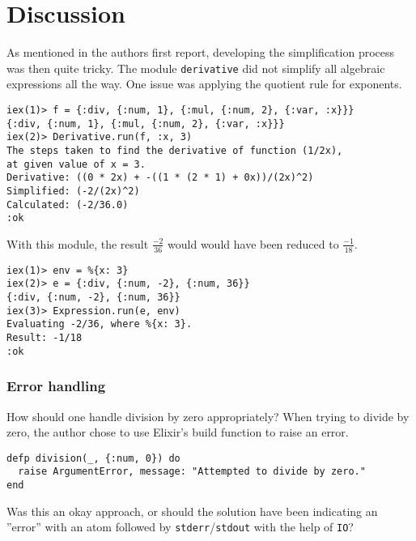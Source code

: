 \documentclass[a4paper,11pt]{article}
\begin{document}
\section*{Discussion}
\label{sec:discussion}
As mentioned in the authors first report,
developing the simplification process was then quite tricky.
The module \texttt{derivative} did not simplify
all algebraic expressions all the way.
One issue was applying the quotient rule for exponents.
\begin{verbatim}
iex(1)> f = {:div, {:num, 1}, {:mul, {:num, 2}, {:var, :x}}}
{:div, {:num, 1}, {:mul, {:num, 2}, {:var, :x}}}
iex(2)> Derivative.run(f, :x, 3)
The steps taken to find the derivative of function (1/2x),
at given value of x = 3.
Derivative: ((0 * 2x) + -((1 * (2 * 1) + 0x))/(2x)^2)
Simplified: (-2/(2x)^2)
Calculated: (-2/36.0)
:ok
\end{verbatim}
With this module, the result $\frac{-2}{36}$ would would have been reduced to $\frac{-1}{18}$.
\begin{verbatim}
iex(1)> env = %{x: 3}
iex(2)> e = {:div, {:num, -2}, {:num, 36}}
{:div, {:num, -2}, {:num, 36}}
iex(3)> Expression.run(e, env)
Evaluating -2/36, where %{x: 3}.
Result: -1/18
:ok
\end{verbatim}
\subsubsection*{Error handling}
How should one handle division by zero appropriately?
When trying to divide by zero, the author chose to use Elixir's build function
to raise an error.
\begin{verbatim}
defp division(_, {:num, 0}) do
  raise ArgumentError, message: "Attempted to divide by zero."
end
\end{verbatim}
Was this an okay approach, or should the solution have been indicating an ''error''
with an atom followed by \verb|stderr|/\verb|stdout| with the help of \verb|IO|?
\end{document}
